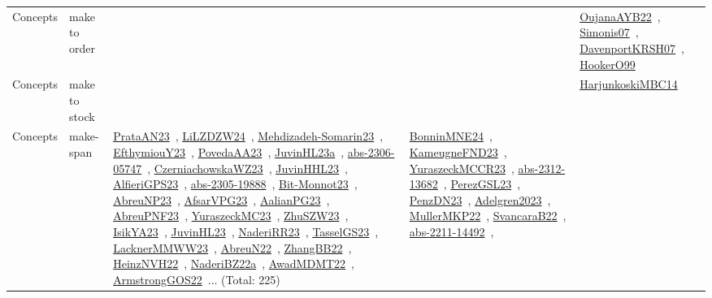 {\begin{longtable}{lp{3cm}>{\raggedright\arraybackslash}p{6cm}>{\raggedright\arraybackslash}p{6cm}>{\raggedright\arraybackslash}p{8cm}}
Concepts & make to order &  &  & \href{../works/OujanaAYB22.pdf}{OujanaAYB22}~\cite{OujanaAYB22}, \href{../works/Simonis07.pdf}{Simonis07}~\cite{Simonis07}, \href{../works/DavenportKRSH07.pdf}{DavenportKRSH07}~\cite{DavenportKRSH07}, \href{../works/HookerO99.pdf}{HookerO99}~\cite{HookerO99}\\
Concepts & make to stock &  &  & \href{../works/HarjunkoskiMBC14.pdf}{HarjunkoskiMBC14}~\cite{HarjunkoskiMBC14}\\
Concepts & make-span & \href{../works/PrataAN23.pdf}{PrataAN23}~\cite{PrataAN23}, \href{../works/LiLZDZW24.pdf}{LiLZDZW24}~\cite{LiLZDZW24}, \href{../works/Mehdizadeh-Somarin23.pdf}{Mehdizadeh-Somarin23}~\cite{Mehdizadeh-Somarin23}, \href{../works/EfthymiouY23.pdf}{EfthymiouY23}~\cite{EfthymiouY23}, \href{../works/PovedaAA23.pdf}{PovedaAA23}~\cite{PovedaAA23}, \href{../works/JuvinHL23a.pdf}{JuvinHL23a}~\cite{JuvinHL23a}, \href{../works/abs-2306-05747.pdf}{abs-2306-05747}~\cite{abs-2306-05747}, \href{../works/CzerniachowskaWZ23.pdf}{CzerniachowskaWZ23}~\cite{CzerniachowskaWZ23}, \href{../works/JuvinHHL23.pdf}{JuvinHHL23}~\cite{JuvinHHL23}, \href{../works/AlfieriGPS23.pdf}{AlfieriGPS23}~\cite{AlfieriGPS23}, \href{../works/abs-2305-19888.pdf}{abs-2305-19888}~\cite{abs-2305-19888}, \href{../works/Bit-Monnot23.pdf}{Bit-Monnot23}~\cite{Bit-Monnot23}, \href{../works/AbreuNP23.pdf}{AbreuNP23}~\cite{AbreuNP23}, \href{../works/AfsarVPG23.pdf}{AfsarVPG23}~\cite{AfsarVPG23}, \href{../works/AalianPG23.pdf}{AalianPG23}~\cite{AalianPG23}, \href{../works/AbreuPNF23.pdf}{AbreuPNF23}~\cite{AbreuPNF23}, \href{../works/YuraszeckMC23.pdf}{YuraszeckMC23}~\cite{YuraszeckMC23}, \href{../works/ZhuSZW23.pdf}{ZhuSZW23}~\cite{ZhuSZW23}, \href{../works/IsikYA23.pdf}{IsikYA23}~\cite{IsikYA23}, \href{../works/JuvinHL23.pdf}{JuvinHL23}~\cite{JuvinHL23}, \href{../works/NaderiRR23.pdf}{NaderiRR23}~\cite{NaderiRR23}, \href{../works/TasselGS23.pdf}{TasselGS23}~\cite{TasselGS23}, \href{../works/LacknerMMWW23.pdf}{LacknerMMWW23}~\cite{LacknerMMWW23}, \href{../works/AbreuN22.pdf}{AbreuN22}~\cite{AbreuN22}, \href{../works/ZhangBB22.pdf}{ZhangBB22}~\cite{ZhangBB22}, \href{../works/HeinzNVH22.pdf}{HeinzNVH22}~\cite{HeinzNVH22}, \href{../works/NaderiBZ22a.pdf}{NaderiBZ22a}~\cite{NaderiBZ22a}, \href{../works/AwadMDMT22.pdf}{AwadMDMT22}~\cite{AwadMDMT22}, \href{../works/ArmstrongGOS22.pdf}{ArmstrongGOS22}~\cite{ArmstrongGOS22}... (Total: 225) & \href{../works/BonninMNE24.pdf}{BonninMNE24}~\cite{BonninMNE24}, \href{../works/KameugneFND23.pdf}{KameugneFND23}~\cite{KameugneFND23}, \href{../works/YuraszeckMCCR23.pdf}{YuraszeckMCCR23}~\cite{YuraszeckMCCR23}, \href{../works/abs-2312-13682.pdf}{abs-2312-13682}~\cite{abs-2312-13682}, \href{../works/PerezGSL23.pdf}{PerezGSL23}~\cite{PerezGSL23}, \href{../works/PenzDN23.pdf}{PenzDN23}~\cite{PenzDN23}, \href{../works/Adelgren2023.pdf}{Adelgren2023}~\cite{Adelgren2023}, \href{../works/MullerMKP22.pdf}{MullerMKP22}~\cite{MullerMKP22}, \href{../works/SvancaraB22.pdf}{SvancaraB22}~\cite{SvancaraB22}, \href{../works/abs-2211-14492.pdf}{abs-2211-14492}~\cite{abs-2211-14492}, 
\end{longtable}}
